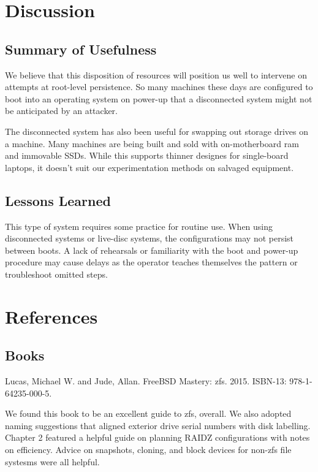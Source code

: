 
\section{Discussion}
\subsection{Summary of Usefulness}
We believe that this disposition of resources will position us well to intervene on attempts at root-level persistence.  So many machines these days are configured to boot into an \gls{operating system} on power-up that a disconnected system might not be anticipated by an attacker.

The disconnected system has also been useful for swapping out storage drives on a machine.  Many machines are being built and sold with on-\gls{motherboard} \gls{ram} and immovable SSDs.  While this supports thinner designes for single-board laptops, it doesn't suit our experimentation methods on salvaged equipment.

\subsection{Lessons Learned}
This type of system requires some practice for routine use.  When using disconnected systems or live-disc systems, the configurations may not persist between boots.  A lack of rehearsals or familiarity with the boot and power-up procedure may cause delays as the operator teaches themselves the pattern or troubleshoot omitted steps.





\section{References}
\subsection{Books}
Lucas, Michael W. and Jude, Allan.  FreeBSD Mastery:  \gls{zfs}.  2015.  ISBN-13:  978-1-64235-000-5.

We found this book to be an excellent guide to \gls{zfs}, overall.  We also adopted naming suggestions that aligned exterior drive serial numbers with disk labelling.  Chapter 2 featured a helpful guide on planning RAIDZ configurations with notes on efficiency.  Advice on snapshots, cloning, and block devices for non-\gls{zfs} file systesms were all helpful.


